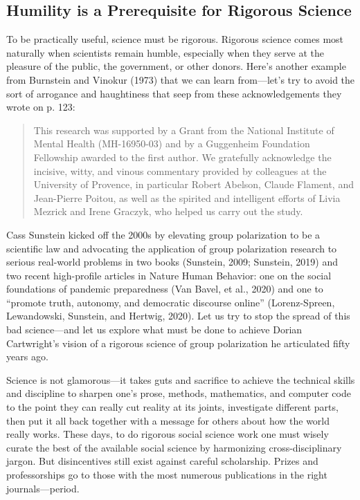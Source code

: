 \documentclass[preview]{article}
\begin{document}
\subsection{Humility is a Prerequisite for Rigorous Science}

To be practically useful, science must be rigorous. Rigorous science comes most naturally when scientists remain humble, especially when they serve at the pleasure of the public, the government, or other donors. Here’s another example from Burnstein and Vinokur (1973) that we can learn from—let’s try to avoid the sort of arrogance and haughtiness that seep from these acknowledgements they wrote on p. 123:

\begin{quote}
This research was supported by a Grant from the National Institute of Mental Health (MH-16950-03) and by a Guggenheim Foundation Fellowship awarded to the first author. We gratefully acknowledge the incisive, witty, and vinous commentary provided by colleagues at the University of Provence, in particular Robert Abelson, Claude Flament, and Jean-Pierre Poitou, as well as the spirited and intelligent efforts of Livia Mezrick and Irene Graczyk, who helped us carry out the study.
\end{quote}

Cass Sunstein kicked off the 2000s by elevating group polarization to be a scientific law and advocating the application of group polarization research to serious real-world problems in two books (Sunstein, 2009; Sunstein, 2019) and two recent high-profile articles in Nature Human Behavior: one on the social foundations of pandemic preparedness (Van Bavel, et al., 2020) and one to “promote truth, autonomy, and democratic discourse online” (Lorenz-Spreen, Lewandowski, Sunstein, and Hertwig, 2020). Let us try to stop the spread of this bad science—and let us explore what must be done to achieve Dorian Cartwright’s vision of a rigorous science of group polarization he articulated fifty years ago.


Science is not glamorous—it takes guts and sacrifice to achieve the technical skills and discipline to sharpen one’s prose, methods, mathematics, and computer code to the point they can really cut reality at its joints, investigate different parts, then put it all back together with a message for others about how the world really works. These days, to do rigorous social science work one must wisely curate the best of the available social science by harmonizing cross-disciplinary jargon. But disincentives still exist against careful scholarship. Prizes and professorships go to those with the most numerous publications in the right journals—period.
\end{document}
